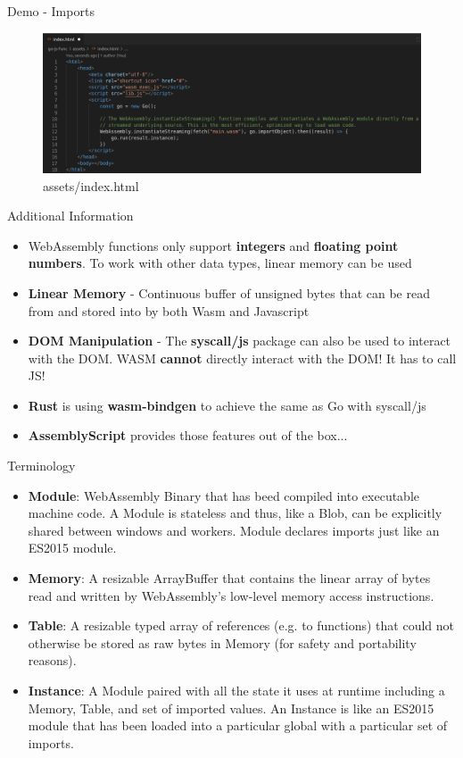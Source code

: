 \documentclass{beamer}
\begin{document}
\begin{frame}{Demo - Imports}
    \begin{figure}
        \includegraphics[scale=0.2]{./images/importindex.png}
        \caption{assets/index.html}
    \end{figure}
\end{frame}

\begin{frame}{Additional Information}
    \begin{itemize}
        \item WebAssembly functions only support \textbf{integers} and \textbf{floating point numbers}. To work with other data types, linear memory can be used
        \item \textbf{Linear Memory} - Continuous buffer of unsigned bytes that can be read from and stored into by both Wasm and Javascript
        \item \textbf{DOM Manipulation} - The \textbf{syscall/js} package can also be used to interact with the DOM. WASM \textbf{cannot} directly interact with the DOM! It has to call JS!
        \item \textbf{Rust} is using \textbf{wasm-bindgen} to achieve the same as Go with syscall/js
        \item \textbf{AssemblyScript} provides those features out of the box...
    \end{itemize}
\end{frame}

\begin{frame}{Terminology}
    \begin{itemize}
        \item \textbf{Module}: WebAssembly Binary that has beed compiled into executable machine code. A Module is stateless and thus, like a Blob, can be explicitly shared between windows and workers. Module declares imports just like an ES2015 module.
        \item \textbf{Memory}: A resizable ArrayBuffer that contains the linear array of bytes read and written by WebAssembly’s low-level memory access instructions.
        \item \textbf{Table}: A resizable typed array of references (e.g. to functions) that could not otherwise be stored as raw bytes in Memory (for safety and portability reasons).
        \item \textbf{Instance}: A Module paired with all the state it uses at runtime including a Memory, Table, and set of imported values. An Instance is like an ES2015 module that has been loaded into a particular global with a particular set of imports.
    \end{itemize}
\end{frame}
\end{document}
